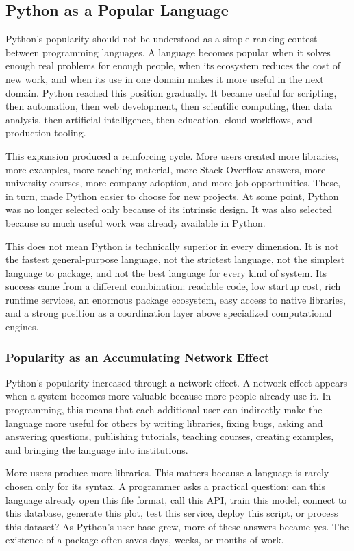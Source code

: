 \subsection{Python as a Popular Language}

Python's popularity should not be understood as a simple ranking contest between programming languages. A language becomes popular when it solves enough real problems for enough people, when its ecosystem reduces the cost of new work, and when its use in one domain makes it more useful in the next domain. Python reached this position gradually. It became useful for scripting, then automation, then web development, then scientific computing, then data analysis, then artificial intelligence, then education, cloud workflows, and production tooling.

This expansion produced a reinforcing cycle. More users created more libraries, more examples, more teaching material, more Stack Overflow answers, more university courses, more company adoption, and more job opportunities. These, in turn, made Python easier to choose for new projects. At some point, Python was no longer selected only because of its intrinsic design. It was also selected because so much useful work was already available in Python.

This does not mean Python is technically superior in every dimension. It is not the fastest general-purpose language, not the strictest language, not the simplest language to package, and not the best language for every kind of system. Its success came from a different combination: readable code, low startup cost, rich runtime services, an enormous package ecosystem, easy access to native libraries, and a strong position as a coordination layer above specialized computational engines.

\subsubsection{Popularity as an Accumulating Network Effect}

Python's popularity increased through a network effect. A network effect appears when a system becomes more valuable because more people already use it. In programming, this means that each additional user can indirectly make the language more useful for others by writing libraries, fixing bugs, asking and answering questions, publishing tutorials, teaching courses, creating examples, and bringing the language into institutions.

More users produce more libraries. This matters because a language is rarely chosen only for its syntax. A programmer asks a practical question: can this language already open this file format, call this API, train this model, connect to this database, generate this plot, test this service, deploy this script, or process this dataset? As Python's user base grew, more of these answers became yes. The existence of a package often saves days, weeks, or months of work.


